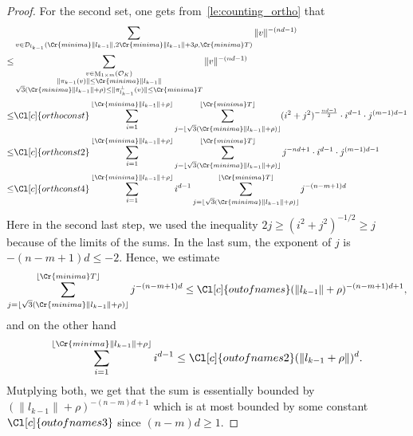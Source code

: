 \documentclass{amsart}
\theoremstyle{definition}
\theoremstyle{remark}
\newcommand{\OK}{\mathcal{O}_K}
\DeclareMathOperator{\M}{M}
\begin{document}
\begin{proof}
For the second set, one gets from~\cref{le:counting_ortho} that
\begin{align}
    & 
    \sum_{v \in 
    \mathcal{D}_{l_{k-1}}( \Cr{minima} \|l_{k-1}\|,2 \Cr{minima}\|l_{k-1}\|  + 3\rho,\Cr{minima}T)    }   \|v\|^{-(nd-1)} \\
    \leq  & 
    \sum_{\substack{v \in  \M_{1 \times m}(\OK) \\ \|\pi_{k-1}(v)\| \leq  \Cr{minima} \|l_{k-1}\| \\  \sqrt{3} (\Cr{minima} \|l_{k-1}\| + \rho)  \leq \|\pi^{\perp}_{l_{k-1}}(v)\| \leq \Cr{minima} T }   }  
    \|v\|^{-(nd-1)} \\
    \leq  & 
     \Cl[c]{orthoconst}\sum_{i=1}^{\lfloor \Cr{minima} \|l_{k-1}\| + \rho\rfloor} \sum_{j= \lfloor \sqrt{3}( \Cr{minima}\|l_{k-1}\| + \rho)\rfloor}^{ \lfloor \Cr{minima} T \rfloor} (i^{2} + j^{2} )^{-\frac{nd-1}{2}} \cdot i^{d -1} \cdot j^{(m-1)d-1} \\
    \leq  & 
     \Cl[c]{orthconst2} 
    \sum_{i=1}^{\lfloor \Cr{minima} \|l_{k-1}\| + \rho\rfloor} \sum_{j= \lfloor \sqrt{3}( \Cr{minima}\|l_{k-1}\| + \rho)\rfloor}^{ \lfloor \Cr{minima} T \rfloor} j^{-{nd+1}} \cdot i^{d -1} \cdot j^{(m-1)d-1} \\
    \leq  & 
     \Cl[c]{orthconst4} 
    \sum_{i=1}^{\lfloor \Cr{minima} \|l_{k-1}\| + \rho\rfloor} i^{d-1}
    \sum_{j= \lfloor \sqrt{3}( \Cr{minima}\|l_{k-1}\| + \rho)\rfloor}^{ \lfloor \Cr{minima} T \rfloor}  j^{-(n-m+1)d }\\
\end{align}
Here in the second last step, we used the inequality $  2j \geq (i^{2}+j^{2})^{-1/2} \geq j$ because of the limits of the sums.
In the last sum, the exponent of $j$ is $-(n-m+1)d \leq -2$. 
Hence, we estimate
\begin{equation}
    \sum_{j= \lfloor \sqrt{3}( \Cr{minima}\|l_{k-1}\| + \rho)\rfloor}^{ \lfloor \Cr{minima} T \rfloor}  j^{-(n-m+1)d } 
    \leq \Cl[c]{outofnames} (\|l_{k-1}\| + \rho)^{-(n-m+1)d + 1},
\end{equation}
and on the other hand
\begin{equation}
    \sum_{i=1}^{\lfloor \Cr{minima} \|l_{k-1}\| + \rho\rfloor} i^{d-1} \leq \Cl[c]{outofnames2} (\|l_{k-1} + \rho\|)^{d}.
\end{equation}
Mutplying both, we get that the sum is essentially bounded by $(\|l_{k-1}\| + \rho)^{-(n-m)d+1}$ which is at most bounded by some constant $\Cl[c]{outofnames3}$ since
$(n-m)d \geq 1$.


\end{proof}
\end{document}
